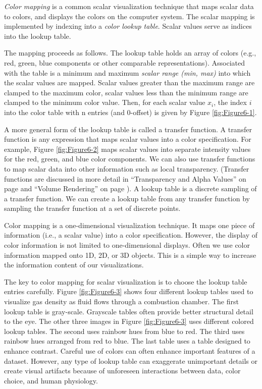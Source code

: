 \emph{Color mapping} is a common scalar visualization technique that maps scalar data to colors, and displays the colors on the computer system. The scalar mapping is implemented by indexing into a \emph{color lookup table}. Scalar values serve as indices into the lookup table.

The mapping proceeds as follows. The lookup table holds an array of colors (e.g., red, green, blue components or other comparable representations). Associated with the table is a minimum and maximum \emph{scalar range (min, max)} into which the scalar values are mapped. Scalar values greater than the maximum range are clamped to the maximum color, scalar values less than the minimum range are clamped to the minimum color value. Then, for each scalar value $x_i$, the index $i$ into the color table with n entries (and 0-offset) is given by Figure \ref{fig:Figure6-1}.

A more general form of the lookup table is called a transfer function. A transfer function is any expression that maps scalar values into a color specification. For example, Figure \ref{fig:Figure6-2} maps scalar values into separate intensity values for the red, green, and blue color components. We can also use transfer functions to map scalar data into other information such as local transparency. (Transfer functions are discussed in more detail in ``Transparency and Alpha Values'' on page \pageref{sec:transparency_alpha} and ``Volume Rendering'' on page \pageref{sec:volume_rendering}).
A lookup table is a discrete sampling of a transfer function.
We can create a lookup table from any transfer function by sampling the transfer function at a set of discrete points.

Color mapping is a one-dimensional visualization technique. It maps one piece of information (i.e., a scalar value) into a color specification. However, the display of color information is not limited to one-dimensional displays. Often we use color information mapped onto 1D, 2D, or 3D objects. This is a simple way to increase the information content of our visualizations.

The key to color mapping for scalar visualization is to choose the lookup table entries carefully. Figure \ref{fig:Figure6-3} shows four different lookup tables used to visualize gas density as fluid flows through a combustion chamber. The first lookup table is gray-scale. Grayscale tables often provide better structural detail to the eye. The other three images in Figure \ref{fig:Figure6-3} uses different colored lookup tables. The second uses rainbow hues from blue to red. The third uses rainbow hues arranged from red to blue. The last table uses a table designed to enhance contrast. Careful use of colors can often enhance important features of a dataset. However, any type of lookup table can exaggerate unimportant details or create visual artifacts because of unforeseen interactions between data, color choice, and human physiology.


